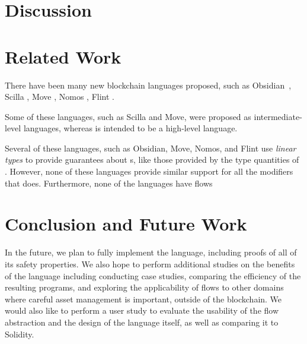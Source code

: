 \documentclass[dvipsnames, usenames, sigconf]{acmart}
\begin{document}
\section{Discussion}

\section{Related Work}
There have been many new blockchain languages proposed, such as Obsidian~\cite{coblenz2019obsidian}, Scilla , Move , Nomos , Flint .

Some of these languages, such as Scilla and Move, were proposed as intermediate-level languages, whereas \langName is intended to be a high-level language.

Several of these languages, such as Obsidian, Move, Nomos, and Flint use \emph{linear types} to provide guarantees about \assetTxt{}s, like those provided by the type quantities of \langName.
However, none of these languages provide similar support for all the modifiers that \langName does.
Furthermore, none of the languages have flows 

\section{Conclusion and Future Work}


In the future, we plan to fully implement the \langName language, including proofs of all of its safety properties.
We also hope to perform additional studies on the benefits of the language including conducting case studies, comparing the efficiency of the resulting programs, and exploring the applicability of flows to other domains where careful asset management is important, outside of the blockchain.
We would also like to perform a user study to evaluate the usability of the flow abstraction and the design of the language itself, as well as comparing it to Solidity.
\end{document}
